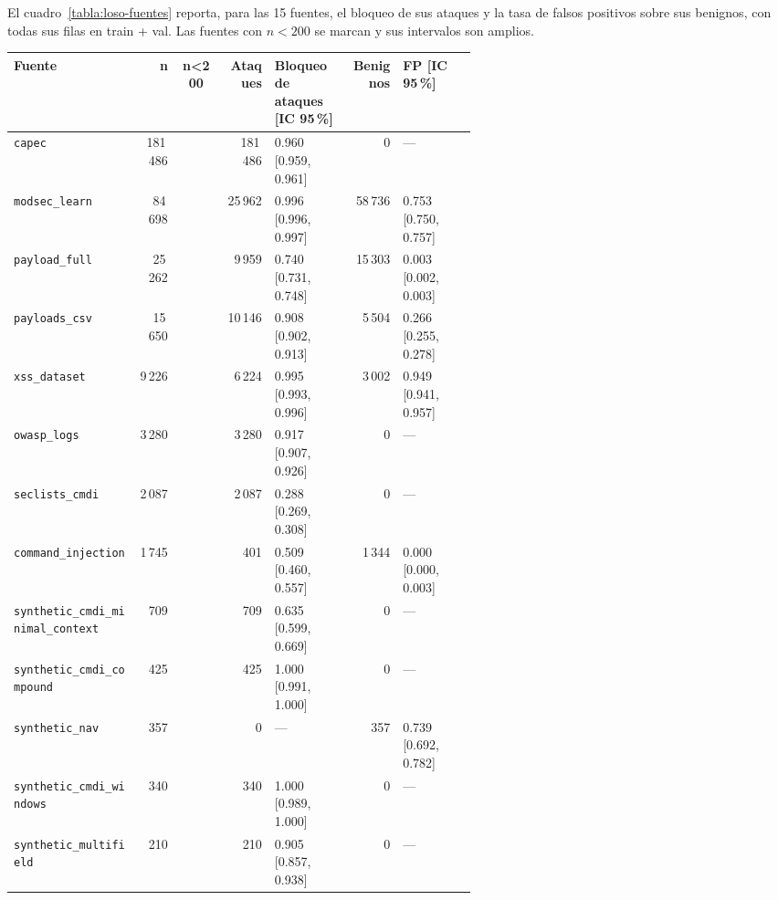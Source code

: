 El cuadro~\ref{tabla:loso-fuentes} reporta, para las 15 fuentes, el bloqueo de sus ataques y la tasa de falsos positivos sobre sus benignos, con todas sus filas en train + val. Las fuentes con $n < 200$ se marcan y sus intervalos son amplios.

\begin{table}[htbp]
\centering
\footnotesize
\setlength{\tabcolsep}{3pt}
\begin{tabular}{|p{0.27\linewidth}|r|c|r|p{0.16\linewidth}|r|p{0.16\linewidth}|}
\hline
\textbf{Fuente} & \textbf{n} & \textbf{n<200} & \textbf{Ataques} & \textbf{Bloqueo de ataques [IC 95\,\%]} & \textbf{Benignos} & \textbf{FP [IC 95\,\%]} \\ \hline
\texttt{capec} & 181\,486 &  & 181\,486 & 0.960 [0.959, 0.961] & 0 & — \\ \hline
\texttt{modsec\_\allowbreak{}learn} & 84\,698 &  & 25\,962 & 0.996 [0.996, 0.997] & 58\,736 & 0.753 [0.750, 0.757] \\ \hline
\texttt{payload\_\allowbreak{}full} & 25\,262 &  & 9\,959 & 0.740 [0.731, 0.748] & 15\,303 & 0.003 [0.002, 0.003] \\ \hline
\texttt{payloads\_\allowbreak{}csv} & 15\,650 &  & 10\,146 & 0.908 [0.902, 0.913] & 5\,504 & 0.266 [0.255, 0.278] \\ \hline
\texttt{xss\_\allowbreak{}dataset} & 9\,226 &  & 6\,224 & 0.995 [0.993, 0.996] & 3\,002 & 0.949 [0.941, 0.957] \\ \hline
\texttt{owasp\_\allowbreak{}logs} & 3\,280 &  & 3\,280 & 0.917 [0.907, 0.926] & 0 & — \\ \hline
\texttt{seclists\_\allowbreak{}cmdi} & 2\,087 &  & 2\,087 & 0.288 [0.269, 0.308] & 0 & — \\ \hline
\texttt{command\_\allowbreak{}injection} & 1\,745 &  & 401 & 0.509 [0.460, 0.557] & 1\,344 & 0.000 [0.000, 0.003] \\ \hline
\texttt{synthetic\_\allowbreak{}cmdi\_\allowbreak{}minimal\_\allowbreak{}context} & 709 &  & 709 & 0.635 [0.599, 0.669] & 0 & — \\ \hline
\texttt{synthetic\_\allowbreak{}cmdi\_\allowbreak{}compound} & 425 &  & 425 & 1.000 [0.991, 1.000] & 0 & — \\ \hline
\texttt{synthetic\_\allowbreak{}nav} & 357 &  & 0 & — & 357 & 0.739 [0.692, 0.782] \\ \hline
\texttt{synthetic\_\allowbreak{}cmdi\_\allowbreak{}windows} & 340 &  & 340 & 1.000 [0.989, 1.000] & 0 & — \\ \hline
\texttt{synthetic\_\allowbreak{}multifield} & 210 &  & 210 & 0.905 [0.857, 0.938] & 0 & — \\ \hline

\end{tabular}
\end{table}
